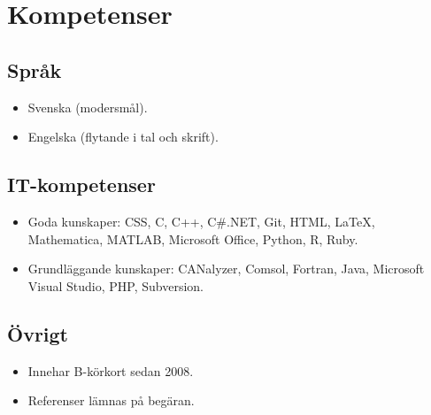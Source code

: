 \documentclass{skvitae}
\begin{document}
	\section{Kompetenser}
	\subsection{Språk}
	\begin{itemize}
		\item Svenska (modersmål).
		\item Engelska (flytande i tal och skrift).
	\end{itemize}

	\subsection{IT-kompetenser}
	\begin{itemize}
		\item Goda kunskaper: CSS, C, C++, C\#.NET, Git, HTML, \LaTeX, Mathematica, MATLAB, Microsoft Office, Python, R, Ruby.
		\item Grundläggande kunskaper: CANalyzer, Comsol, Fortran, Java, Microsoft Visual Studio, PHP, Subversion.
	\end{itemize}

	\subsection{Övrigt}
	\begin{itemize}
		\item Innehar B-körkort sedan 2008.
		\item Referenser lämnas på begäran.
	\end{itemize}
\end{document}
